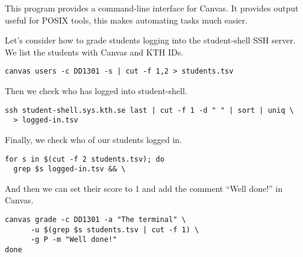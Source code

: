 
This program provides a command-line interface for Canvas.
It provides output useful for POSIX tools, this makes automating tasks much 
easier.

Let's consider how to grade students logging into the student-shell SSH server.
We list the students with Canvas and KTH IDs.
\begin{lstlisting}
canvas users -c DD1301 -s | cut -f 1,2 > students.tsv
\end{lstlisting}
Then we check who has logged into student-shell.
\begin{lstlisting}[firstnumber=2]
ssh student-shell.sys.kth.se last | cut -f 1 -d " " | sort | uniq \
  > logged-in.tsv
\end{lstlisting}
Finally, we check who of our students logged in.
\begin{lstlisting}[firstnumber=4]
for s in $(cut -f 2 students.tsv); do
  grep $s logged-in.tsv && \
\end{lstlisting}
And then we can set their score to 1 and add the comment \enquote{Well done!} 
in Canvas.
\begin{lstlisting}[firstnumber=6]
    canvas grade -c DD1301 -a "The terminal" \
      -u $(grep $s students.tsv | cut -f 1) \
      -g P -m "Well done!"
done
\end{lstlisting}

